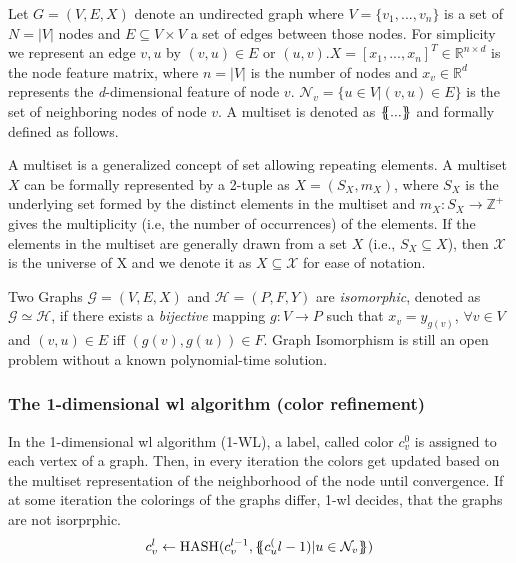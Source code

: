 Let $G = (V,E, X)$ denote an undirected graph where $V =\{v_{1},...,v_{n}\}$ is a set of $ N = |V|$
nodes and $E \subseteq V\times V $ a set of edges between those nodes. For simplicity we
represent an edge ${v,u}$ by $(v,u) \in E$ or $(u,v)$.$X= [x_{1},...,x_{n}]^{T} \in \mathbb{R}^{n \times d}$
is the node feature matrix, where $n = |V|$ is the number of nodes and $x_{v} \in \mathbb{R}^{d}$
represents the \textit{d}-dimensional feature of node $v$. $\mathcal{N}_{v}= \{u \in V|(v,u) \in E\}$
is the set of neighboring nodes of node $v$. A multiset is denoted
as $\ldblbrace...\rdblbrace$ and formally defined as follows.
\begin{defn}[Multiset]
    A multiset is a generalized concept of set allowing repeating elements. A multiset $X$
    can be formally represented by a 2-tuple as $X = (S_{X}, m_{X})$, where $S_{X}$ is the
    underlying set formed by the distinct elements in the multiset and $m_{X}:S_{X} \rightarrow
        \mathbb{Z}^{+}$ gives the multiplicity (i.e, the number of occurrences) of the elements.
    If the elements in the multiset are generally drawn from a set $X$ (i.e., $S_{X} \subseteq X$),
    then $\mathcal{X}$ is the universe of X and we denote it as $X \subseteq \mathcal{X}$ for ease
    of notation.
\end{defn}
\begin{defn}[Isomorphism]
    Two Graphs $\mathcal{G}= (V,E,X)$ and $\mathcal{H}= (P,F,Y)$ are \textit{isomorphic}, denoted as
    $\mathcal{G} \simeq \mathcal{H}$, if there exists a \textit{bijective} mapping $g: V \rightarrow P$
    such that $x_{v}= y_{g(v)}$, $\forall v \in V$ and $(v,u) \in E$ iff $(g(v),g(u)) \in F$. Graph
    Isomorphism is still an open problem without a known polynomial-time solution.
\end{defn}



\subsubsection{The 1-dimensional \acs{wl} algorithm (color refinement)}
In the 1-dimensional \ac{wl} algorithm (1-WL), a label, called color $c_{v}^{0}$ is assigned to each
vertex of a graph. Then, in every iteration the colors get updated based on the multiset representation
of the neighborhood of the node until convergence. If at some iteration the colorings of the graphs
differ, 1-\ac{wl} decides, that the graphs are not isorprphic.
\begin{align*}
    c_{v}^{l} \leftarrow \mathrm{HASH}(c_{v}^{l-1}, \ldblbrace c_{u}^(l-1)| u \in \mathcal{N}_{v} \rdblbrace)
\end{align*}
\\

